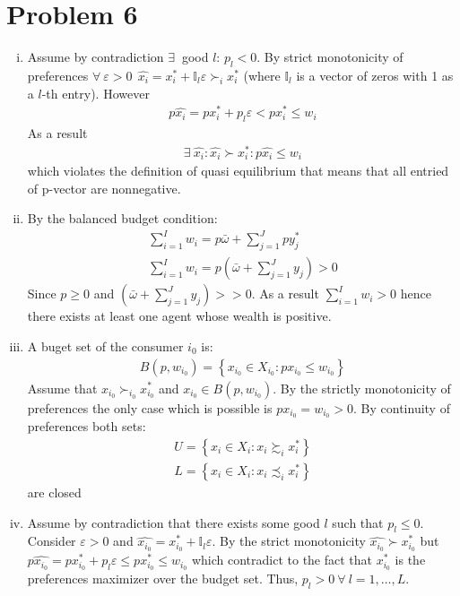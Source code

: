 \documentclass[a4paper]{article}
\begin{document}
\section*{Problem 6}
\begin{enumerate}[(i)]
	\item Assume by contradiction $\exists\ $ good $l$: $p_l < 0$. By strict monotonicity of preferences $\forall\ \varepsilon >0\ \ \hat{x_i} = x_i^* + \mathbb{I}_l\varepsilon \succ_i x_i^*$ (where $\mathbb{I}_l$ is a vector of zeros with 1 as a $l$-th entry). However 
	\begin{align*}
	p\hat{x_i} = px_i^* + p_l\varepsilon < px_i^* \le w_i
	\end{align*}
	As a result 
	\begin{align*}
	\exists\ \hat{x_i}: \hat{x_i} \succ x_i^*: p\hat{x_i} \le w_i
	\end{align*}
	which violates the definition of quasi equilibrium that means that all entried of p-vector are nonnegative.
	\item By the balanced budget condition:
	\begin{align*}
	\sum_{i=1}^I w_i = p \bar{\omega} + \sum_{j=1}^J py_j^*\\
	\sum_{i=1}^I w_i = p \left(\bar{\omega} + \sum_{j=1}^J y_j\right) > 0
	\end{align*}
	Since $p \ge 0$ and $\left(\bar{\omega} + \sum_{j=1}^J y_j\right) >> 0$. As a result $\sum_{i=1}^I w_i > 0$ hence there exists at least one agent whose wealth is positive.
	\item A buget set of the consumer $i_0$ is:
	\begin{align*}
	B(p, w_{i_0}) = \left\{x_{i_0} \in X_{i_0}: px_{i_0} \le w_{i_0} \right\}
	\end{align*}
	Assume that $x_{i_0} \succ_{i_0} x^*_{i_0}$ and $x_{i_0} \in B(p, w_{i_0})$. By the strictly monotonicity of preferences the only case which is possible is $px_{i_0} = w_{i_0} > 0$. By continuity of preferences both sets:
	\begin{align*}
	U = \left\{x_i \in X_i: x_i \succsim_i x_i^* \right\}\\
	L = \left\{x_i \in X_i: x_i \precsim_i x_i^* \right\}
	\end{align*}
	are closed
	\item Assume by contradiction that there exists some good $l$ such that $p_l \le 0$. Consider $\varepsilon > 0$ and $\hat{x_{i_0}} = x_{i_0}^* + \mathbb{I}_l\varepsilon$. By the strict monotonicity $\hat{x_{i_0}} \succ x_{i_0}^*$ but $p\hat{x_{i_0}} = px_{i_0}^* + p_l\varepsilon \le px_{i_0}^* \le w_{i_0}$ which contradict to the fact that $x_{i_0}^*$ is the preferences maximizer over the budget set. Thus, $p_l > 0\ \forall\ l = 1, \dots, L$. 

\end{enumerate}
\end{document}
